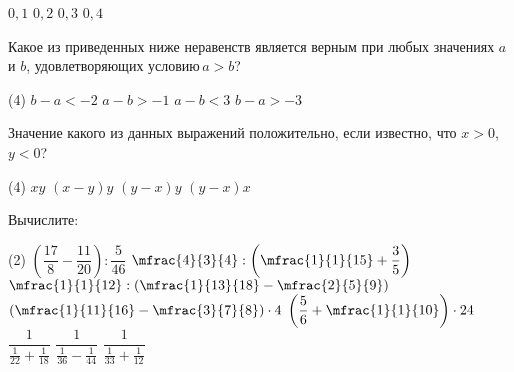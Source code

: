 \begin{class}[number=2]
\begin{listofex}
\begin{tasks}
			\task \( 0,1 \)
			\task \( 0,2 \)
			\task \( 0,3 \)
			\task \( 0,4 \)
		\end{tasks}
		\item Какое из приведенных ниже неравенств является верным при любых значениях \( a \) и \( b \), удовлетворяющих условию \( a>b \)?
		\begin{tasks}(4)
			\task \( b-a<-2 \)
			\task \( a-b>-1 \)
			\task \( a-b<3 \)
			\task \( b-a>-3 \)
		\end{tasks}
	\newpage
		\item Значение какого из данных выражений положительно, если известно, что \( x>0 \), \( y<0 \)?
		\begin{tasks}(4)
			\task \( xy \)
			\task \( (x-y)y \)
			\task \( (y-x)y \)
			\task \( (y-x)x \)
		\end{tasks}
		\item Вычислите:
		\begin{tasks}(2)
			\task \( \left( \dfrac{17}{8}-\dfrac{11}{20} \right):\dfrac{5}{46} \)
			\task \( \mfrac{4}{3}{4}:\left( \mfrac{1}{1}{15}+\dfrac{3}{5} \right) \)
			\task \( \mfrac{1}{1}{12}:\left( \mfrac{1}{13}{18}-\mfrac{2}{5}{9} \right) \)
			\task \( \left( \mfrac{1}{11}{16}-\mfrac{3}{7}{8} \right)\cdot4 \)
			\task \( \left( \dfrac{5}{6}+\mfrac{1}{1}{10} \right)\cdot24 \)
			\task \( \dfrac{1}{\frac{1}{22}+\frac{1}{18}} \)
			\task \( \dfrac{1}{\frac{1}{36}-\frac{1}{44}} \)
			\task \( \dfrac{1}{\frac{1}{33}+\frac{1}{12}} \)
		\end{tasks}
	\end{listofex}
\end{class}


